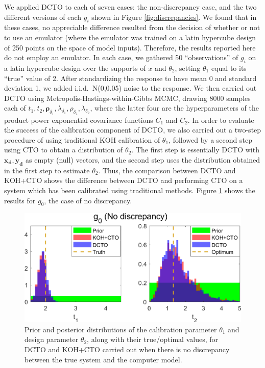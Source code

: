 \documentclass[12pt]{article}
\begin{document}
%
We applied DCTO to each of seven cases: the non-discrepancy case, and the two different versions of each $g_i$ shown in Figure \ref{fig:discrepancies}.
%
We found that in these cases, no appreciable difference resulted from the decision of whether or not to use an emulator (where the emulator was trained on a latin hypercube design of 250 points on the space of model inputs).
%
Therefore, the results reported here do not employ an emulator.
%
In each case, we gathered 50 ``observations'' of $g_i$ on a latin hypercube design over the supports of $x$ and $\theta_2$, setting $\theta_1$ equal to its ``true'' value of 2.
%
After standardizing the response to have mean 0 and standard deviation 1, we added i.i.d.\ N(0,0.05) noise to the response.
%
We then carried out DCTO using Metropolis-Hastings-within-Gibbs MCMC, drawing 8000 samples each of $t_1,t_2,\boldsymbol\rho_{\delta_1},\lambda_{\delta_1},\rho_{\delta_2},\lambda_{\delta_2}$, where the latter four are the hyperparameters of the product power exponential covariance functions $C_1$ and $C_2$.
%
In order to evaluate the success of the calibration component of DCTO, we also carried out a two-step procedure of using traditional KOH calibration of $\theta_1$, followed by a second step using CTO to obtain a distribution of $\theta_2$. 
%
The first step is essentially DCTO with $\mathbf{x_d},\mathbf{y_d}$ as empty (null) vectors, and the second step uses the distribution obtained in the first step to estimate $\theta_2$.
%
Thus, the comparison between DCTO and KOH+CTO shows the difference between DCTO and performing CTO on a system which has been calibrated using traditional methods.
%
%
Figure \ref{fig:no_discrep_results} shows the results for $g_0$, the case of no discrepancy.
%
\begin{figure}
\centering
\includegraphics[scale=0.85]{FIG_KOHCTO_DCTO_comp_discrep0_results}
\captionsetup{width=.85\linewidth}
\caption{Prior and posterior distributions of the calibration parameter $\theta_1$ and design parameter $\theta_2$, along with their true/optimal values, for DCTO and KOH+CTO carried out when there is no discrepancy between the true system and the computer model.}
\label{fig:no_discrep_results}
\end{figure}
\end{document}
